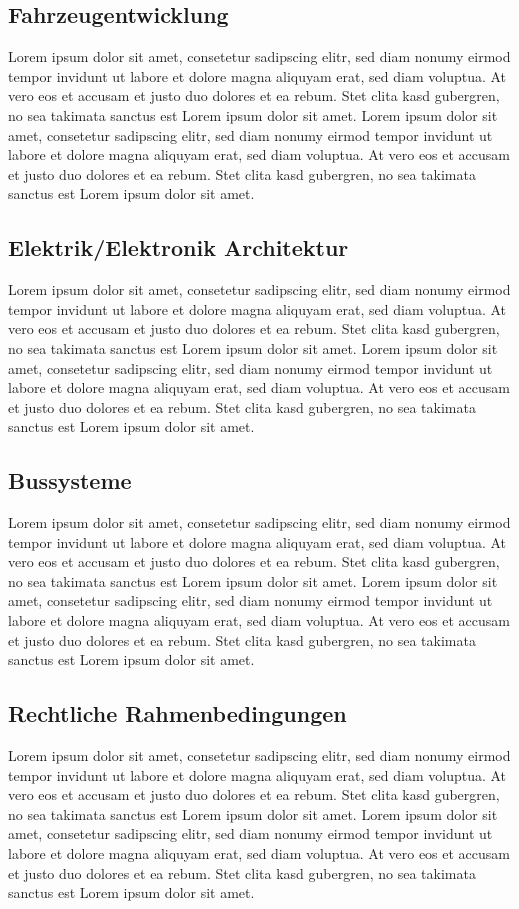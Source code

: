 \subsection{Fahrzeugentwicklung}
Lorem ipsum dolor sit amet, consetetur sadipscing elitr, sed diam nonumy eirmod tempor invidunt ut labore et dolore magna aliquyam erat, sed diam voluptua. At vero eos et accusam et justo duo dolores et ea rebum. Stet clita kasd gubergren, no sea takimata sanctus est Lorem ipsum dolor sit amet. Lorem ipsum dolor sit amet, consetetur sadipscing elitr, sed diam nonumy eirmod tempor invidunt ut labore et dolore magna aliquyam erat, sed diam voluptua. At vero eos et accusam et justo duo dolores et ea rebum. Stet clita kasd gubergren, no sea takimata sanctus est Lorem ipsum dolor sit amet.
\subsection{Elektrik/Elektronik Architektur}
Lorem ipsum dolor sit amet, consetetur sadipscing elitr, sed diam nonumy eirmod tempor invidunt ut labore et dolore magna aliquyam erat, sed diam voluptua. At vero eos et accusam et justo duo dolores et ea rebum. Stet clita kasd gubergren, no sea takimata sanctus est Lorem ipsum dolor sit amet. Lorem ipsum dolor sit amet, consetetur sadipscing elitr, sed diam nonumy eirmod tempor invidunt ut labore et dolore magna aliquyam erat, sed diam voluptua. At vero eos et accusam et justo duo dolores et ea rebum. Stet clita kasd gubergren, no sea takimata sanctus est Lorem ipsum dolor sit amet.
\subsection{Bussysteme}
Lorem ipsum dolor sit amet, consetetur sadipscing elitr, sed diam nonumy eirmod tempor invidunt ut labore et dolore magna aliquyam erat, sed diam voluptua. At vero eos et accusam et justo duo dolores et ea rebum. Stet clita kasd gubergren, no sea takimata sanctus est Lorem ipsum dolor sit amet. Lorem ipsum dolor sit amet, consetetur sadipscing elitr, sed diam nonumy eirmod tempor invidunt ut labore et dolore magna aliquyam erat, sed diam voluptua. At vero eos et accusam et justo duo dolores et ea rebum. Stet clita kasd gubergren, no sea takimata sanctus est Lorem ipsum dolor sit amet.
\subsection{Rechtliche Rahmenbedingungen}
Lorem ipsum dolor sit amet, consetetur sadipscing elitr, sed diam nonumy eirmod tempor invidunt ut labore et dolore magna aliquyam erat, sed diam voluptua. At vero eos et accusam et justo duo dolores et ea rebum. Stet clita kasd gubergren, no sea takimata sanctus est Lorem ipsum dolor sit amet. Lorem ipsum dolor sit amet, consetetur sadipscing elitr, sed diam nonumy eirmod tempor invidunt ut labore et dolore magna aliquyam erat, sed diam voluptua. At vero eos et accusam et justo duo dolores et ea rebum. Stet clita kasd gubergren, no sea takimata sanctus est Lorem ipsum dolor sit amet.
